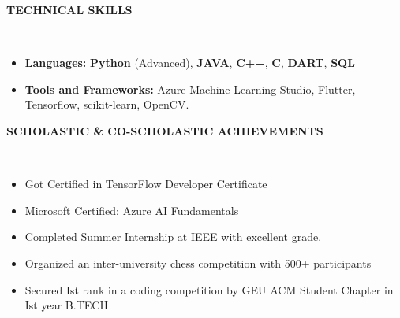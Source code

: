 \documentclass[a4paper,10pt]{article}
\newcommand{\lsep}{-0.5cm}
\newcommand{\resheading}[1]{{\small \colorbox{mygrey}{\begin{minipage}{0.98\textwidth}{\textbf{#1 \vphantom{p\^{E}}}}\end{minipage}}}}
\begin{document}
\resheading{\textbf{TECHNICAL SKILLS} }\\[\lsep]
\begin{itemize}[itemsep=0.1mm, parsep=0pt]
\item \noindent \textbf{Languages:} \textbf{Python} (Advanced), \textbf{JAVA}, \textbf{C++}, \textbf{C}, \textbf{DART},  \textbf{SQL}
\item \noindent\textbf{Tools and Frameworks:} Azure Machine Learning Studio, Flutter, Tensorflow, scikit-learn, OpenCV.
\end{itemize}

\resheading{\textbf{SCHOLASTIC \& CO-SCHOLASTIC ACHIEVEMENTS} }\\[\lsep]
\begin{itemize}[itemsep=0.01mm, parsep=2pt]
\item \noindent Got Certified in TensorFlow Developer Certificate
\item \noindent Microsoft Certified: Azure AI Fundamentals
\item \noindent Completed Summer Internship at IEEE with excellent grade.
\item \noindent Organized an inter-university chess competition with 500+ participants
\item \noindent Secured Ist rank in a coding competition by GEU ACM Student Chapter in Ist year B.TECH
\end{itemize}
\end{document}
